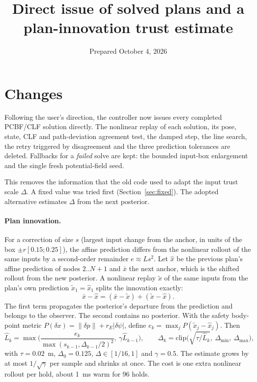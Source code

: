 \documentclass[11pt]{article}
\title{Direct issue of solved plans and a plan-innovation trust estimate}
\date{Prepared October 4, 2026}
\begin{document}
\maketitle

\section{Changes}
Following the user's direction, the controller now issues every completed
PCBF/CLF solution directly. The nonlinear replay of each solution, its pose,
state, CLF and path-deviation agreement test, the damped step, the line search,
the retry triggered by disagreement and the three prediction tolerances are
deleted. Fallbacks for a \emph{failed} solve are kept: the bounded input-box
enlargement and the single fresh potential-field seed.

This removes the information that the old code used to adapt the input trust
scale $\Delta$. A fixed value was tried first (Section~\ref{sec:fixed}). The
adopted alternative estimates $\Delta$ from the next posterior.

\paragraph{Plan innovation.}
For a correction of size $s$ (largest input change from the anchor, in units
of the box $\pm r[0.15;0.25]$), the affine prediction differs from the nonlinear
rollout of the same inputs by a second-order remainder $e\approx L s^2$. Let
$\hat x$ be the previous plan's affine prediction of nodes $2..N{+}1$ and
$\bar x$ the next anchor, which is the shifted rollout from the new posterior.
A nonlinear replay $\tilde x$ of the same inputs from the plan's own prediction
$\tilde x_1=\hat x_1$ splits the innovation exactly:
\[
\bar x-\hat x=(\bar x-\tilde x)+(\tilde x-\hat x).
\]
The first term propagates the posterior's departure from the prediction and
belongs to the observer. The second contains no posterior. With the safety
body-point metric $P(\delta x)=\|\delta p\|+r_E|\delta\psi|$, define
$e_k=\max_j P(\tilde x_j-\hat x_j)$. Then
\[
\hat L_k=\max\!\Big(\frac{e_k}{\max(s_{k-1},\Delta_{k-1}/2)^2},\ \gamma\hat L_{k-1}\Big),\qquad
\Delta_k=\mathrm{clip}\Big(\sqrt{\tau/\hat L_k},\ \Delta_{\min},\ \Delta_{\max}\Big),
\]
with $\tau=0.02$~m, $\Delta_0=0.125$, $\Delta\in[1/16,1]$ and $\gamma=0.5$.
The estimate grows by at most $1/\sqrt\gamma$ per sample and shrinks at once.
The cost is one extra nonlinear rollout per hold, about 1~ms warm for 96 holds.
\end{document}
